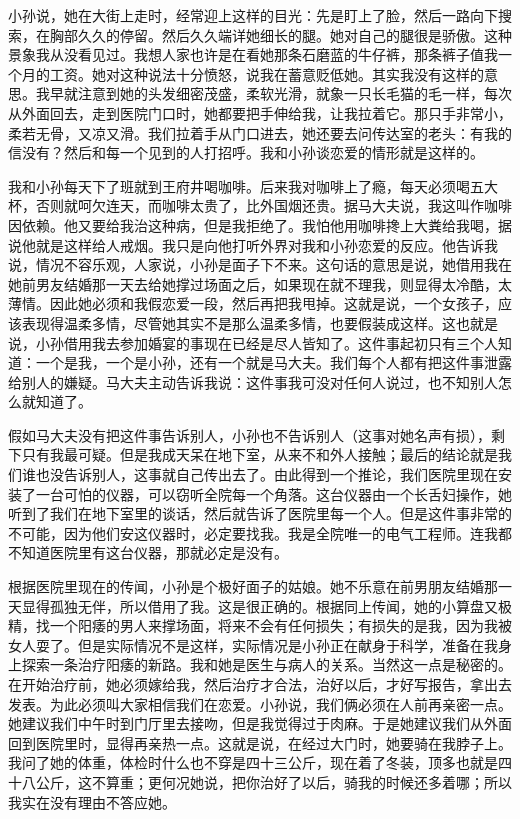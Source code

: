 小孙说，她在大街上走时，经常迎上这样的目光：先是盯上了脸，然后一路向下搜索，在胸部久久的停留。然后久久端详她细长的腿。她对自己的腿很是骄傲。这种景象我从没看见过。我想人家也许是在看她那条石磨蓝的牛仔裤，那条裤子值我一个月的工资。她对这种说法十分愤怒，说我在蓄意贬低她。其实我没有这样的意思。我早就注意到她的头发细密茂盛，柔软光滑，就象一只长毛猫的毛一样，每次从外面回去，走到医院门口时，她都要把手伸给我，让我拉着它。那只手非常小，柔若无骨，又凉又滑。我们拉着手从门口进去，她还要去问传达室的老头：有我的信没有？然后和每一个见到的人打招呼。我和小孙谈恋爱的情形就是这样的。 

我和小孙每天下了班就到王府井喝咖啡。后来我对咖啡上了瘾，每天必须喝五大杯，否则就呵欠连天，而咖啡太贵了，比外国烟还贵。据马大夫说，我这叫作咖啡因依赖。他又要给我治这种病，但是我拒绝了。我怕他用咖啡搀上大粪给我喝，据说他就是这样给人戒烟。我只是向他打听外界对我和小孙恋爱的反应。他告诉我说，情况不容乐观，人家说，小孙是面子下不来。这句话的意思是说，她借用我在她前男友结婚那一天去给她撑过场面之后，如果现在就不理我，则显得太冷酷，太薄情。因此她必须和我假恋爱一段，然后再把我甩掉。这就是说，一个女孩子，应该表现得温柔多情，尽管她其实不是那么温柔多情，也要假装成这样。这也就是说，小孙借用我去参加婚宴的事现在已经是尽人皆知了。这件事起初只有三个人知道：一个是我，一个是小孙，还有一个就是马大夫。我们每个人都有把这件事泄露给别人的嫌疑。马大夫主动告诉我说：这件事我可没对任何人说过，也不知别人怎么就知道了。 

假如马大夫没有把这件事告诉别人，小孙也不告诉别人（这事对她名声有损），剩下只有我最可疑。但是我成天呆在地下室，从来不和外人接触；最后的结论就是我们谁也没告诉别人，这事就自己传出去了。由此得到一个推论，我们医院里现在安装了一台可怕的仪器，可以窃听全院每一个角落。这台仪器由一个长舌妇操作，她听到了我们在地下室里的谈话，然后就告诉了医院里每一个人。但是这件事非常的不可能，因为他们安这仪器时，必定要找我。我是全院唯一的电气工程师。连我都不知道医院里有这台仪器，那就必定是没有。 

根据医院里现在的传闻，小孙是个极好面子的姑娘。她不乐意在前男朋友结婚那一天显得孤独无伴，所以借用了我。这是很正确的。根据同上传闻，她的小算盘又极精，找一个阳痿的男人来撑场面，将来不会有任何损失；有损失的是我，因为我被女人耍了。但是实际情况不是这样，实际情况是小孙正在献身于科学，准备在我身上探索一条治疗阳痿的新路。我和她是医生与病人的关系。当然这一点是秘密的。在开始治疗前，她必须嫁给我，然后治疗才合法，治好以后，才好写报告，拿出去发表。为此必须叫大家相信我们在恋爱。小孙说，我们俩必须在人前再亲密一点。她建议我们中午时到门厅里去接吻，但是我觉得过于肉麻。于是她建议我们从外面回到医院里时，显得再亲热一点。这就是说，在经过大门时，她要骑在我脖子上。我问了她的体重，体检时什么也不穿是四十三公斤，现在着了冬装，顶多也就是四十八公斤，这不算重；更何况她说，把你治好了以后，骑我的时候还多着哪；所以我实在没有理由不答应她。 

